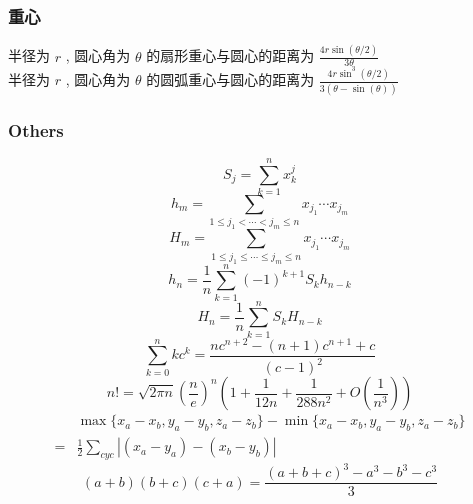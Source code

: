 \begin{small}
\subsubsection{重心}
半径为 $r$ , 圆心角为 $\theta$ 的扇形重心与圆心的距离为 $\frac{4r\sin(\theta/2)}{3\theta}$ \\
半径为 $r$ , 圆心角为 $\theta$ 的圆弧重心与圆心的距离为 $\frac{4r\sin^3(\theta/2)}{3(\theta-\sin(\theta))}$ \\

\subsubsection{Others}
\[ S_j = \sum_{k=1}^nx_k^j \]
\[ h_m = \sum_{1\leq j_1 < \cdots < j_m \leq n} x_{j_1}\cdots x_{j_m} \]
\[ H_m = \sum_{1\leq j_1 \leq \cdots \leq j_m \leq n} x_{j_1}\cdots x_{j_m} \]
\[ h_n = \frac{1}{n}\sum_{k=1}^n(-1)^{k+1}S_kh_{n-k} \]
\[ H_n = \frac{1}{n}\sum_{k=1}^nS_kH_{n-k} \]
\[ \sum_{k=0}^nkc^k = \frac{nc^{n+2}-(n+1)c^{n+1}+c}{(c-1)^2} \]
\[ n! = \sqrt{2\pi n}(\frac{n}{e})^n(1+\frac{1}{12n}+\frac{1}{288n^2}+O(\frac{1}{n^3})) \]
\[ \begin{aligned}
 &\max{\{x_a-x_b, y_a-y_b, z_a-z_b\}} - \min{\{x_a-x_b, y_a-y_b, z_a-z_b\}} \\
=& \frac{1}{2}\sum_{cyc}\left| (x_a-y_a)-(x_b-y_b) \right|
\end{aligned} \]
\[ (a+b)(b+c)(c+a) = \frac{(a+b+c)^3 - a^3 - b^3 - c^3}{3} \]
\end{small}
